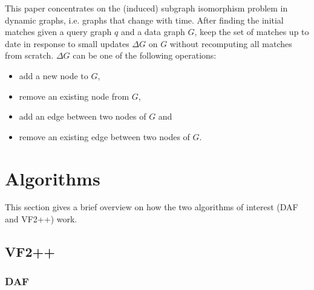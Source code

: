 This paper concentrates on the (induced) subgraph isomorphism problem in dynamic
graphs, i.e. graphs that change with time. After finding the initial matches given a
query graph \(q\) and a data graph \(G\), keep the set of matches up to date in response
to small updates \(\Delta G \) on \(G\) without recomputing all matches from scratch.
\(\Delta G\) can be one of the following operations:
\begin{itemize}
    \item add a new node to \(G\),
    \item remove an existing node from \(G\),
    \item add an edge between two nodes of \(G\) and
    \item remove an existing edge between two nodes of \(G\).
\end{itemize}

\section{Algorithms}

This section gives a brief overview on how the two algorithms of interest (DAF and VF2++)
work.

\subsection{VF2++}

\subsubsection{DAF}